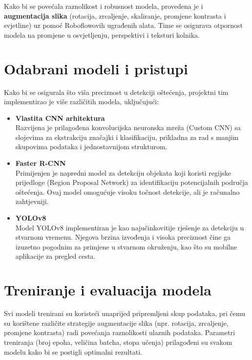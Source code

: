 \documentclass[seminarskirad]{fer}
\begin{document}
Kako bi se povećala raznolikost i robusnost modela, provedena je i \textbf{augmentacija slika} (rotacija, zrcaljenje, skaliranje, promjene kontrasta i svjetline) uz pomoć Roboflowovih ugrađenih alata. Time se osigurava otpornost modela na promjene u osvjetljenju, perspektivi i teksturi kolnika.

\section{Odabrani modeli i pristupi}
\label{sec:odabrani_modeli}

Kako bi se osigurala što viša preciznost u detekciji oštećenja, projektni tim implementirao je više različitih modela, uključujući:

\begin{itemize}
    \item \textbf{Vlastita CNN arhitektura} \\
    Razvijena je prilagođena konvolucijska neuronska mreža (Custom CNN) sa slojevima za ekstrakciju značajki i klasifikaciju, prikladna za rad s manjim skupovima podataka i jednostavnijom strukturom.
    
    \item \textbf{Faster R-CNN} \\
    Primijenjen je napredni model za detekciju objekata koji koristi regijske prijedloge (Region Proposal Network) za identifikaciju potencijalnih područja oštećenja. Ovaj model omogućuje visoku točnost detekcije, ali je računalno zahtjevniji.
    
    \item \textbf{YOLOv8} \\
    Model YOLOv8 implementiran je kao najučinkovitije rješenje za detekciju u stvarnom vremenu. Njegova brzina izvođenja i visoka preciznost čine ga izuzetno pogodnim za primjene u stvarnom okruženju, kao što su mobilne aplikacije za pregled cesta.
\end{itemize}

\section{Treniranje i evaluacija modela}
\label{sec:treniranje_evaluacija}

Svi modeli trenirani su koristeći unaprijed pripremljeni skup podataka, pri čemu su korištene različite strategije augmentacije slika (npr. rotacija, zrcaljenje, promjene kontrasta) radi povećanja raznolikosti ulaznih podataka. Parametri treniranja (broj epoha, veličina batcha, stopa učenja) prilagođeni su svakom modelu kako bi se postigli optimalni rezultati.
\end{document}
